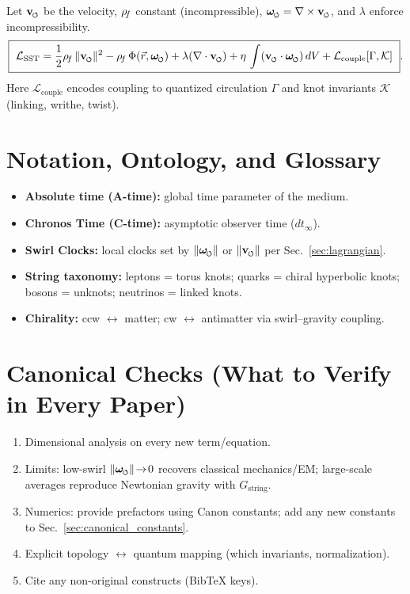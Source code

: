 \documentclass[11pt]{article}
\begin{document}
    Let $\vswirl$ be the velocity, $\rho_{\!f}$ constant (incompressible), $\omegas=\nabla\times\vswirl$, and $\lambda$ enforce incompressibility.
    \[
        \boxed{\
        \mathcal{L}_{\text{SST}} =
            \frac{1}{2}\rhof\,\lVert\vswirl\rVert^{2}
            - \rhof\,\Phi(\vec r,\omegas)
            + \lambda(\nabla\cdot\vswirl)
            + \eta\,\int (\vswirl\cdot\omegas)\,dV
            + \mathcal{L}_{\text{couple}}[\Gamma,\mathcal{K}]
            \ }.
    \]
    Here $\mathcal{L}_{\text{couple}}$ encodes coupling to quantized circulation $\Gamma$ and knot invariants $\mathcal{K}$ (linking, writhe, twist).

    \section{Notation, Ontology, and Glossary}
    \begin{itemize}
        \item \textbf{Absolute time (A-time):} global time parameter of the medium.
        \item \textbf{Chronos Time (C-time):} asymptotic observer time ($dt_{\infty}$).
        \item \textbf{Swirl Clocks:} local clocks set by \(\lVert\omegas\rVert\) or \(\lVert\vswirl\rVert\) per Sec.~\ref{sec:lagrangian}.
        \item \textbf{String taxonomy:} leptons = torus knots; quarks = chiral hyperbolic knots; bosons = unknots; neutrinos = linked knots.
        \item \textbf{Chirality:} ccw $\leftrightarrow$ matter; cw $\leftrightarrow$ antimatter via swirl–gravity coupling.
    \end{itemize}

    \section{Canonical Checks (What to Verify in Every Paper)}
    \begin{enumerate}
        \item Dimensional analysis on every new term/equation.
        \item Limits: low-swirl \(\lVert\omegas\rVert\!\to\!0\) recovers classical mechanics/EM; large-scale averages reproduce Newtonian gravity with \(G_{\text{string}}\).
        \item Numerics: provide prefactors using Canon constants; add any new constants to Sec.~\ref{sec:canonical_constants}.
        \item Explicit topology \(\leftrightarrow\) quantum mapping (which invariants, normalization).
        \item Cite any non-original constructs (BibTeX keys).
    \end{enumerate}
\end{document}
